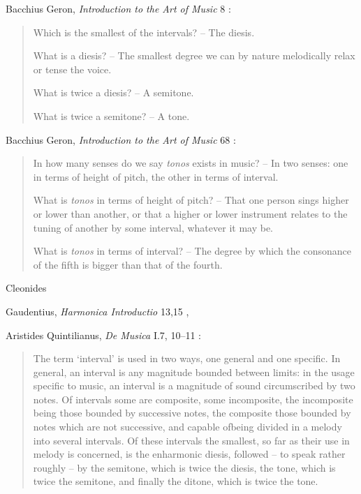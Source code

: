 \documentclass{article}
\theoremstyle{definition}
\begin{document}
Bacchius Geron, {\em Introduction to the Art of Music} 8 \cite[pp.~273--274]{bacchius}:

\begin{quote}
Which is the smallest of the intervals? -- The diesis.

What is a diesis? -- The smallest degree we can by nature melodically relax or tense
 the voice.
 
What is twice a diesis? -- A semitone.
  
What is twice a semitone? -- A tone.
\end{quote}

Bacchius Geron, {\em Introduction to the Art of Music} 68 \cite[p.~287]{bacchius}:

\begin{quote}
 In how many senses do we say {\em tonos} exists in music? -- In two senses: one in terms of height of pitch, the other in terms
 of interval.
 
 What is {\em tonos} in terms of height of pitch?
 -- That one person sings higher or lower than another, or that a
 higher or lower instrument relates to the tuning of another by
 some interval, whatever it may be.
 
 What is {\em tonos} in terms of interval?
 -- The degree by which the consonance of the fifth is bigger than
 that of the fourth.
\end{quote}

Cleonides \cite{strunk}

Gaudentius, {\em Harmonica Introductio} 13,15 \cite{strunk}, \cite[p.~327]{MSG}

Aristides Quintilianus, {\em De Musica} I.7, 10--11 \cite[p.~410]{barker}:

\begin{quote}
The term `interval' is used in two ways, one general and one
specific. In general, an interval is any magnitude bounded between limits: in
the usage specific to music, an interval is a magnitude of sound circumscribed
by two notes. Of intervals some are composite, some incomposite, the
incomposite being those bounded by successive notes, the composite those
bounded by notes which are not successive, and capable ofbeing divided in a
melody into several intervals. Of these intervals the smallest, so far as their
use in melody is concerned, is the enharmonic diesis, followed -- to speak
rather roughly -- by the semitone, which is twice the diesis, the tone, which is
twice the semitone, and finally the ditone, which is twice the tone.
\end{quote}
\end{document}

